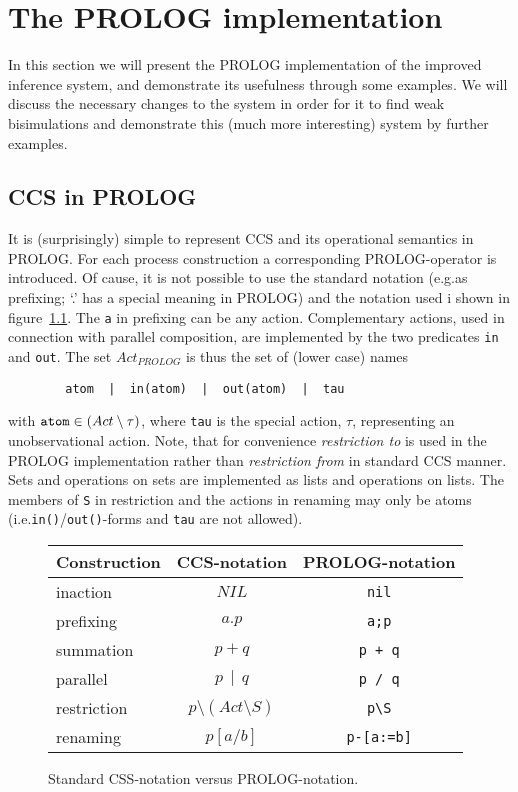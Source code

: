 
\chapter{The PROLOG implementation}\label{chapProlog}
In this section we will present the PROLOG implementation of the improved inference system, and demonstrate its usefulness through some examples. We will discuss the necessary changes to the system in order for it to find weak bisimulations and demonstrate this (much more interesting) system by further examples.

\section{CCS in PROLOG}
It is (surprisingly) simple to represent CCS and its operational semantics in PROLOG. For each process construction a corresponding PROLOG-operator is introduced. Of cause, it is not possible to use the standard notation (e.g.\@ as prefixing; `.' has a special meaning in PROLOG) and the notation used i shown in figure~\ref{figPrologCCSnotation}. The {\tt a} in prefixing can be any action. Complementary actions, used in connection with parallel composition, are implemented by the two predicates {\tt in} and {\tt out}. The set $Act_{PROLOG}$ is thus the set of (lower case) names
\begin{verbatim}
        atom  |  in(atom)  |  out(atom)  |  tau
\end{verbatim}
with $\mbox{\tt atom}\in(Act\setminus\tau)$, where {\tt tau} is the special action, $\tau$, representing an unobservational action. Note, that for convenience {\em restriction to\/} is used in the PROLOG implementation rather than {\em restriction from\/} in standard CCS manner. Sets and operations on sets are implemented as lists and operations on lists. The members of {\tt S} in restriction and the actions in renaming may only be atoms (i.e.\@ {\tt in()}/{\tt out()}-forms and {\tt tau} are not allowed).

\begin{figure}
\begin{tabular}{l||cc}
{\Large Construction} & {\Large CCS-notation} & {\Large PROLOG-notation}\\ \hline 
inaction & $NIL$ & {\tt nil}\\
prefixing& $a.p$ & {\tt a;p}\\
summation& $p + q$&{\tt p + q}\\
parallel & $p\,\mid\,q$ & {\tt p / q}\\
restriction& $p\setminus(Act\setminus S)$ & {\tt \verb!p\S!}\\
renaming & $p[a/b]$ & {\tt p-[a:=b]}
\end{tabular}
\caption{Standard CSS-notation versus PROLOG-notation.\label{figPrologCCSnotation}}
\end{figure}

